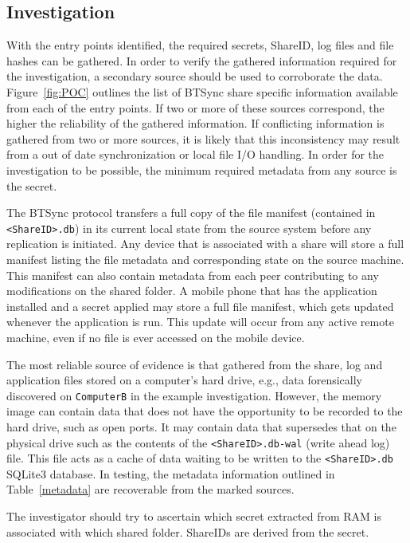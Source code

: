 \documentclass{jdfsl}
\begin{document}
\subsection{Investigation}
\label{POC:Invest}
With the entry points identified, the required secrets, ShareID, log files and file hashes can be gathered. In order to verify the gathered information required for the investigation, a secondary source should be used to corroborate the data. Figure~\ref{fig:POC} outlines the list of BTSync share specific information available from each of the entry points. If two or more of these sources correspond, the higher the reliability of the gathered information. If conflicting information is gathered from two or more sources, it is likely that this inconsistency may result from a out of date synchronization or local file I/O handling. In order for the investigation to be possible, the minimum required metadata from any source is the secret.

The BTSync protocol transfers a full copy of the file manifest (contained in \texttt{<ShareID>.db}) in its current local state from the source system before any replication is initiated. Any device that is associated with a share will store a full manifest listing the file metadata and corresponding state on the source machine. This manifest can also contain metadata from each peer contributing to any modifications on the shared folder. A mobile phone that has the application installed and a secret applied may store a full file manifest, which gets updated whenever the application is run. This update will occur from any active remote machine, even if no file is ever accessed on the mobile device.


The most reliable source of evidence is that gathered from the share, log and application files stored on a computer's hard drive, e.g., data forensically discovered on \texttt{ComputerB} in the example investigation. However, the memory image can contain data that does not have the opportunity to be recorded to the hard drive, such as open ports. It may contain data that supersedes that on the physical drive such as the contents of the \texttt{<ShareID>.db-wal} (write ahead log) file. This file acts as a cache of data waiting to be written to the \texttt{<ShareID>.db} SQLite3 database. In testing, the metadata information outlined in Table~\ref{metadata} are recoverable from the marked sources.

The investigator should try to ascertain which secret extracted from RAM is associated with which shared folder. ShareIDs are derived from the secret.
\end{document}
